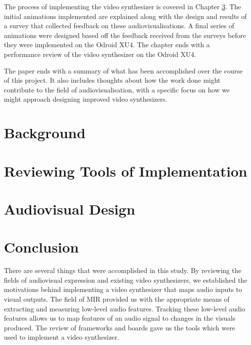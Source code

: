 \documentclass{report}
\begin{document}
The process of implementing the video synthesizer is covered in Chapter \ref{chap:avdesign}. The initial animations implemented are explained along with the design and results of a survey that collected feedback on these audiovisualisations. A final series of animations were designed based off the feedback received from the surveys before they were implemented on the Odroid XU4. The chapter ends with a performance review of the video synthesizer on the Odroid XU4. \par

The paper ends with a summary of what has been accomplished over the course of this project. It also includes thoughts about how the work done might contribute to the field of audiovisualisation, with a specific focus on how we might approach designing improved video synthesizers.


\chapter{Background}\label{chap:background}




\chapter{Reviewing Tools of Implementation}\label{chap:toolreview}



\chapter{Audiovisual Design}\label{chap:avdesign}





\chapter{Conclusion}
There are several things that were accomplished in this study. By reviewing the fields of audiovisual expression and existing video synthesizers, we established the motivations behind implementing a video synthesizer that maps audio inputs to visual outputs. The field of MIR provided us with the appropriate means of extracting and measuring low-level audio features. Tracking these low-level audio features allows us to map features of an audio signal to changes in the visuals produced. The review of frameworks and boards gave us the tools which were used to implement a video synthesizer.
\end{document}
